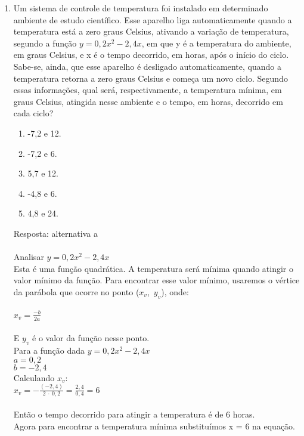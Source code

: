 \documentclass[a4paper,14pt]{article}
\begin{document}
\begin{enumerate}
        \item Um sistema de controle de temperatura foi instalado em determinado ambiente de estudo científico. Esse
        aparelho liga automaticamente quando a temperatura está a zero graus Celsius, ativando a variação de
        temperatura, segundo a função $y = 0,2x^2
        - 2,4x$, em que y é a temperatura do ambiente, em graus Celsius,
        e x é o tempo decorrido, em horas, após o início do ciclo. Sabe-se, ainda, que esse aparelho é desligado
        automaticamente, quando a temperatura retorna a zero graus Celsius e começa um novo ciclo.
        Segundo essas informações, qual será, respectivamente, a temperatura mínima, em graus Celsius,
        atingida nesse ambiente e o tempo, em horas, decorrido em cada ciclo?
        \begin{enumerate}
        	\item -7,2 e 12.
        	\item -7,2 e 6.
        	\item 5,7 e 12.
        	\item -4,8 e 6.
        	\item 4,8 e 24.
        \end{enumerate}
        Resposta: alternativa a \\ \\
        Analisar $y = 0,2x^2 - 2,4x$ \\
        Esta é uma função quadrática. A temperatura será mínima quando atingir o valor mínimo da função. Para encontrar esse valor mínimo, usaremos o vértice da parábola que ocorre no ponto ($x_v$,~$y_v$), onde: \\ \\
        $x_v = \frac{-b}{2a}$ \\ \\
        E $y_v$ é o valor da função nesse ponto. \\
        Para a função dada $y = 0,2x^2 - 2,4x$ \\
        $a = 0,2$ \\
        $b = -2,4$ \\
        Calculando $x_v$: \\
        $x_v = -\frac{(-2,4)}{2~\cdot~0,2} = \frac{2,4}{0,4} = 6$ \\ \\
        Então o tempo decorrido para atingir a temperatura é de 6 horas. \\
        Agora para encontrar a temperatura mínima substituímos x = 6 na equação. \\

\end{enumerate}
\end{document}
